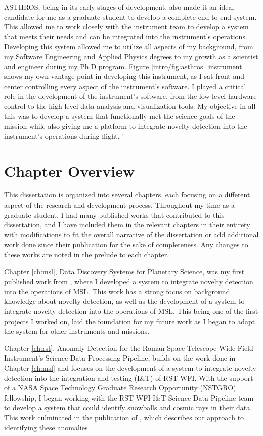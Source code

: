 ASTHROS, being in its early stages of development, also made it an ideal candidate for me as a graduate student to develop a complete end-to-end system.
This allowed me to work closely with the instrument team to develop a system that meets their needs and can be integrated into the instrument's operations.
Developing this system allowed me to utilize all aspects of my background, from my Software Engineering and Applied Physics degrees to my growth as a scientist and engineer during my Ph.D program.
Figure \ref{intro/fig:asthros_instrument} shows my own vantage point in developing this instrument, as I sat front and center controlling every aspect of the instrument's software. 
I played a critical role in the development of the instrument's software, from the low-level hardware control to the high-level data analysis and visualization tools.
My objective in all this was to develop a system that functionally met the science goals of the mission while also giving me a platform to integrate novelty detection into the instrument's operations during flight. '

\section{Chapter Overview}
This dissertation is organized into several chapters, each focusing on a different aspect of the research and development process.
Throughout my time as a graduate student, I had many published works that contributed to this dissertation, and I have included them in the relevant chapters in their entirety with modifications to fit the overall narrative of the dissertation or add additional work done since their publication for the sake of completeness.
Any changes to these works are noted in the prelude to each chapter.

Chapter \ref{ch:msl}, Data Discovery Systems for Planetary Science,  was my first published work from \cite{horton2021integrating}, where I developed a system to integrate novelty detection into the operations of MSL.
This work has a strong focus on background knowledge about novelty detection, as well as the development of a system to integrate novelty detection into the operations of MSL.
This being one of the first projects I worked on, laid the foundation for my future work as I began to adapt the system for other instruments and missions.

Chapter \ref{ch:rst}, Anomaly Detection for the Roman Space Telescope Wide Field Instrument's Science Data Processing Pipeline, builds on the work done in Chapter \ref{ch:msl} and focuses on the development of a system to integrate novelty detection into the integration and testing (I\&T) of RST WFI.
With the support of a NASA Space Technology Graduate Research Opportunity (NSTGRO) fellowship, I began working with the RST WFI I\&T Science Data Pipeline team to develop a system that could identify snowballs and cosmic rays in their data. 
This work culminated in the publication of \cite{horton2024anomaly}, which describes our approach to identifying these anomalies. 

